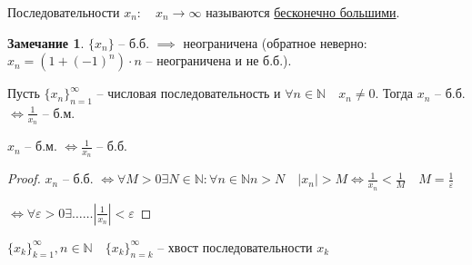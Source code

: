 \documentclass{book}
\newcommand\N{\ensuremath{\mathbb{N}}}
\theoremstyle{definition}
\newtheorem*{note}{Замечание}
\begin{document}
    \begin{definition}
        Последовательности $x_n:\quad x_n\to \infty $ называются \underline{бесконечно большими}.
    \end{definition}
    \begin{note}
        $\{x_n\}$ -- б.б. $\implies $ неограничена (обратное неверно: $x_{n}  = (1+(-1)^n)\cdot n$ -- неограничена и не б.б.).
    \end{note}
    \begin{lemma}

        Пусть $\{x_n\}_{n=1}^{\infty }$ -- числовая последовательность и $\forall n\in \N  \quad x_n\neq 0$. Тогда $x_{n} $ -- б.б. $\iff \frac{1}{x_{n} }$ -- б.м. 

        $x_{n} $ -- б.м. $\iff  \frac{1}{x_{n} }$ -- б.б.
    \end{lemma}
    \begin{proof}
        $x_{n} $ -- б.б. $\iff  \forall M>0 \exists  N\in \N : \forall n\in \N  n>N\quad |x_n| >M \iff \frac{1}{x_{n} }<\frac{1}{M}\quad M = \frac{1}{\varepsilon}$

        $\iff \forall \varepsilon >0 \exists \ldots\ldots \left| \frac{1}{x_{n} } \right| <\varepsilon$
    \end{proof}

    $\{x_k\}_{k=1}^{\infty }, n\in \N \quad \{x_k\}_{n=k}^{\infty }$ -- хвост последовательности $x_k$
\end{document}
